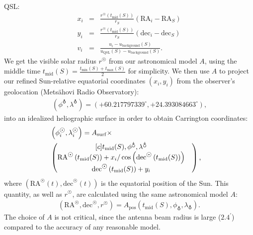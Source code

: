 \documentclass{aa}
\newcommand{\arrc}[1]{\begin{matrix}[c] #1 \end{matrix}}
\newcommand{\eqnl}[2]{\begin{eqnarray}\label{#1}#2\end{eqnarray}}
\newcommand{\s}[2]{{#1}_{\mathrm{#2}}}
\begin{document}
QSL:
\eqnl{calibration}{
x_i &=& \frac{r^{\astrosun} \left( \s{t}{mid}(S) \right)}{r_S} \left( \mathrm{RA}_i -  \mathrm{RA}_S  \right) \\
y_i &=& \frac{r^{\astrosun} \left( \s{t}{mid}(S) \right)}{r_S} \left( \mathrm{dec}_i - \mathrm{dec}_S \right) \\
v_i &=& \frac{u_i - \s{u}{background}(S)}{\s{u}{QSL}(S) - \s{u}{background}(S)} \text{.}
}
We get the visible solar radius $r^{\astrosun}$ from our astronomical model $A$, using the middle time $\s{t}{mid}(S) = 
\frac{\s{t}{min}(S) + \s{t}{max}(S)}{2}$ for simplicity. We then use $A$ to project our refined Sun-relative equatorial coordinates $(x_i,y_i)$ 
from the observer's geolocation (Metsähovi Radio Observatory):
\eqnl{mro_geolocation}{
(\phi^{\earth}, \lambda^{\earth}) = \left( +60.217797339^{\circ}, +24.393084663^{\circ} 
\right) \text{,}}
into an idealized heliographic surface 
in order to obtain Carrington coordinates:
\eqnl{carrington_coordinates}{
&\left( \phi^{\astrosun}_i, 
\lambda^{\astrosun}_i \right) = A_{\rm surf} \times& \\
&\left( \arrc{\s{t}{mid}(S), \phi^{\earth}, \lambda^{\earth}
\\
\mathrm{RA}^{\astrosun} \left( \s{t}{mid}(S) \right) + x_i / \cos \left( \mathrm{dec}^{\astrosun} \left( \s{t}{mid}(S) \right) \right)&
\\
\mathrm{dec}^{\astrosun} \left( \s{t}{mid}(S) \right) + y_i} \right) \nonumber 
\text{,}
}
where $\left( \mathrm{RA}^{\astrosun}(t), \mathrm{dec}^{\astrosun}(t) \right)$ is the equatorial position of the Sun. This quantity, as well as $r^{\astrosun}$, are calculated using the same astronomical model $A$:
\eqnl{astromodel}{
\left( \mathrm{RA}^{\astrosun}, \mathrm{dec}^{\astrosun}, r^{\astrosun} \right) = \s{A}{pos} \left( \s{t}{mid}(S), \phi_{\earth}, \lambda_{\earth} \right) \text{.}
}
The choice of $A$ is not critical, since the antenna beam radius is large ($2.4^\prime$) compared to the accuracy of any 
reasonable model.
\end{document}
